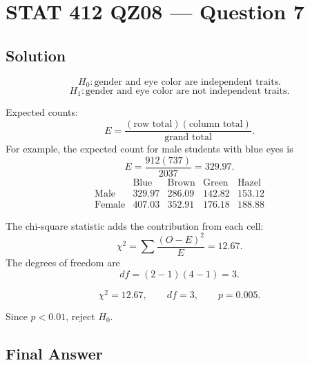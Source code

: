 \documentclass[11pt]{article}
\begin{document}
\section*{STAT 412 QZ08 --- Question 7}

\subsection*{Solution}

\[
H_0:\text{gender and eye color are independent traits.}
\]
\[
H_1:\text{gender and eye color are not independent traits.}
\]

Expected counts:
\[
E=\frac{(\text{row total})(\text{column total})}{\text{grand total}}.
\]
For example, the expected count for male students with blue eyes is
\[
E=\frac{912(737)}{2037}=329.97.
\]
\[
\begin{array}{c|cccc}
 & \text{Blue} & \text{Brown} & \text{Green} & \text{Hazel}\\ \hline
\text{Male} & 329.97 & 286.09 & 142.82 & 153.12\\
\text{Female} & 407.03 & 352.91 & 176.18 & 188.88
\end{array}
\]

The chi-square statistic adds the contribution from each cell:
\[
\chi^2=\sum\frac{(O-E)^2}{E}=12.67.
\]
The degrees of freedom are
\[
df=(2-1)(4-1)=3.
\]

\[
\chi^2=12.67,\qquad df=3,\qquad p=0.005.
\]

Since \(p<0.01\), reject \(H_0\).

\subsection*{Final Answer}

\end{document}
